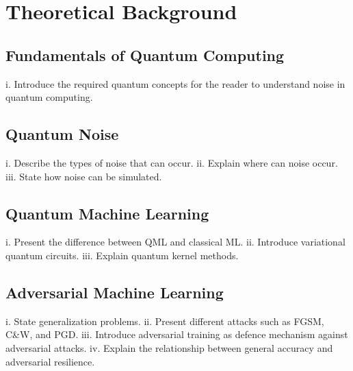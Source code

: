\chapter{Theoretical Background}\label{chapter:background}

\section{Fundamentals of Quantum Computing}
i.	Introduce the required quantum concepts for the reader to understand noise in quantum computing.

\section{Quantum Noise}
i.	Describe the types of noise that can occur.
ii.	Explain where can noise occur.
iii.	State how noise can be simulated.

\section{Quantum Machine Learning}
i.	Present the difference between QML and classical ML.
ii.	Introduce variational quantum circuits.
iii.	Explain quantum kernel methods.

\section{Adversarial Machine Learning}
i.	State generalization problems.
ii.	Present different attacks such as FGSM, C&W, and PGD.
iii.	Introduce adversarial training as defence mechanism against adversarial attacks.
iv.	Explain the relationship between general accuracy and adversarial resilience.